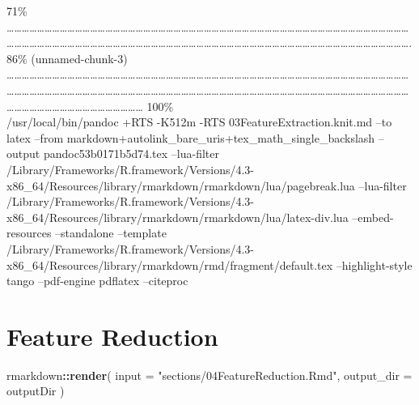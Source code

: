 \documentclass[
]{article}
\newenvironment{Shaded}{\begin{snugshade}}{\end{snugshade}}
\newcommand{\AttributeTok}[1]{\textcolor[rgb]{0.13,0.29,0.53}{#1}}
\newcommand{\FunctionTok}[1]{\textcolor[rgb]{0.13,0.29,0.53}{\textbf{#1}}}
\newcommand{\NormalTok}[1]{#1}
\newcommand{\SpecialCharTok}[1]{\textcolor[rgb]{0.81,0.36,0.00}{\textbf{#1}}}
\newcommand{\StringTok}[1]{\textcolor[rgb]{0.31,0.60,0.02}{#1}}
\begin{document}
\textbar{} 71\% \textbar{}
\textbar\ldots\ldots\ldots\ldots\ldots\ldots\ldots\ldots\ldots\ldots\ldots\ldots\ldots\ldots\ldots\ldots\ldots\ldots\ldots\ldots\ldots\ldots\ldots\ldots\ldots\ldots\ldots\ldots\ldots\ldots\ldots\ldots\ldots\ldots\ldots\ldots\ldots\ldots\ldots\ldots\ldots\ldots\ldots\ldots\ldots\ldots\ldots\ldots\ldots\ldots\ldots\ldots\ldots\ldots\ldots\ldots\ldots\ldots\ldots\ldots\ldots\ldots\ldots\ldots\ldots\ldots\ldots\ldots\ldots\ldots\ldots\ldots\ldots\ldots\ldots\ldots\ldots\ldots\ldots\ldots\ldots\ldots\ldots\ldots\ldots\ldots\ldots\ldots\ldots\ldots\ldots\ldots\ldots\ldots\ldots\ldots\ldots\ldots\ldots\ldots\ldots\ldots\ldots\ldots\ldots\ldots.
\textbar{} 86\% (unnamed-chunk-3) \textbar{}
\textbar\ldots\ldots\ldots\ldots\ldots\ldots\ldots\ldots\ldots\ldots\ldots\ldots\ldots\ldots\ldots\ldots\ldots\ldots\ldots\ldots\ldots\ldots\ldots\ldots\ldots\ldots\ldots\ldots\ldots\ldots\ldots\ldots\ldots\ldots\ldots\ldots\ldots\ldots\ldots\ldots\ldots\ldots\ldots\ldots\ldots\ldots\ldots\ldots\ldots\ldots\ldots\ldots\ldots\ldots\ldots\ldots\ldots\ldots\ldots\ldots\ldots\ldots\ldots\ldots\ldots\ldots\ldots\ldots\ldots\ldots\ldots\ldots\ldots\ldots\ldots\ldots\ldots\ldots\ldots\ldots\ldots\ldots\ldots\ldots\ldots\ldots\ldots\ldots\ldots\ldots\ldots\ldots\ldots\ldots\ldots\ldots\ldots\ldots\ldots\ldots\ldots\ldots\ldots\ldots\ldots\ldots\ldots\ldots\ldots\ldots\ldots\ldots\ldots\ldots\ldots\ldots\ldots\ldots\ldots\ldots\ldots\ldots\ldots\ldots\textbar{}
100\%\\
/usr/local/bin/pandoc +RTS -K512m -RTS 03FeatureExtraction.knit.md --to
latex --from markdown+autolink\_bare\_uris+tex\_math\_single\_backslash
--output pandoc53b0171b5d74.tex --lua-filter
/Library/Frameworks/R.framework/Versions/4.3-x86\_64/Resources/library/rmarkdown/rmarkdown/lua/pagebreak.lua
--lua-filter
/Library/Frameworks/R.framework/Versions/4.3-x86\_64/Resources/library/rmarkdown/rmarkdown/lua/latex-div.lua
--embed-resources --standalone --template
/Library/Frameworks/R.framework/Versions/4.3-x86\_64/Resources/library/rmarkdown/rmd/fragment/default.tex
--highlight-style tango --pdf-engine pdflatex --citeproc

\hypertarget{feature-reduction}{%
\section{Feature Reduction}\label{feature-reduction}}

\begin{Shaded}
\begin{Highlighting}[]
\NormalTok{rmarkdown}\SpecialCharTok{::}\FunctionTok{render}\NormalTok{(}
  \AttributeTok{input =} \StringTok{"sections/04FeatureReduction.Rmd"}\NormalTok{,}
  \AttributeTok{output\_dir =}\NormalTok{ outputDir}
\NormalTok{)}
\end{Highlighting}
\end{Shaded}
\end{document}
